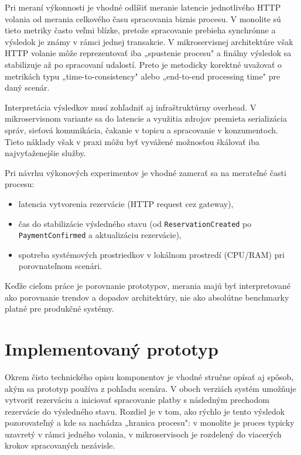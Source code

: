 Pri meraní výkonnosti je vhodné odlíšiť meranie latencie jednotlivého HTTP volania od merania celkového času spracovania biznis procesu. V monolite sú tieto metriky často veľmi blízke, pretože spracovanie prebieha synchrónne a výsledok je známy v rámci jednej transakcie. V mikroservisnej architektúre však HTTP volanie môže reprezentovať iba „spustenie procesu" a finálny výsledok sa stabilizuje až po spracovaní udalostí. Preto je metodicky korektné uvažovať o metrikách typu „time-to-consistency" alebo „end-to-end processing time" pre daný scenár.

Interpretácia výsledkov musí zohľadniť aj infraštruktúrny overhead. V mikroservisnom variante sa do latencie a využitia zdrojov premieta serializácia správ, sieťová komunikácia, čakanie v topicu a spracovanie v konzumentoch. Tieto náklady však v praxi môžu byť vyvážené možnosťou škálovať iba najvyťaženejšie služby.

Pri návrhu výkonových experimentov je vhodné zamerať sa na merateľné časti procesu:
\begin{itemize}
    \item latencia vytvorenia rezervácie (HTTP request cez gateway),
    \item čas do stabilizácie výsledného stavu (od \texttt{Reservation\allowbreak Created} po \texttt{Payment\allowbreak Confirmed} a aktualizáciu re\-zer\-vá\-cie),
    \item spotreba systémových prostriedkov v lokálnom prostredí (CPU/RAM) pri porovnateľnom scenári.
\end{itemize}

Keďže cieľom práce je porovnanie prototypov, merania majú byť interpretované ako porovnanie trendov a dopadov architektúry, nie ako absolútne benchmarky platné pre produkčné systémy.

\section{Implementovaný prototyp}

Okrem čisto technického opisu komponentov je vhodné stručne opísať aj spôsob, akým sa prototyp používa z pohľadu scenára. V oboch verziách systém umožňuje vytvoriť rezerváciu a iniciovať spracovanie platby s následným prechodom rezervácie do výsledného stavu. Rozdiel je v tom, ako rýchlo je tento výsledok pozorovateľný a kde sa nachádza „hranica procesu": v monolite je proces typicky uzavretý v rámci jedného volania, v mikroservisoch je rozdelený do viacerých krokov spracovaných nezávisle.

